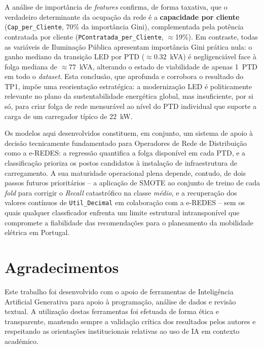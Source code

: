\documentclass[conference]{IEEEtran}
\begin{document}
A an\'alise de import\^ancia de \textit{features} confirma, de forma
taxativa, que o verdadeiro determinante da ocupa\c{c}\~ao da rede \'e a
\textbf{capacidade por cliente} (\texttt{Cap\_per\_Cliente}, 70\% da
import\^ancia Gini), complementada pela pot\^encia contratada por cliente
(\texttt{PContratada\_per\_Cliente}, $\approx$19\%). Em contraste, todas
as vari\'aveis de Ilumina\c{c}\~ao P\'ublica apresentam import\^ancia
Gini pr\'atica nula: o ganho mediano da transi\c{c}\~ao LED por PTD
($\approx 0.32$~kVA) \'e negligenci\'avel face \`a folga mediana de
$\approx 77$~kVA, alterando o estado de viabilidade de apenas 1~PTD em
todo o \textit{dataset}. Esta conclus\~ao, que aprofunda e corrobora o
resultado do TP1, imp\~oe uma reorienta\c{c}\~ao estrat\'egica: a
moderniza\c{c}\~ao LED \'e politicamente relevante no plano da
sustentabilidade energ\'etica global, mas insuficiente, por si s\'o,
para criar folga de rede mensur\'avel ao n\'ivel do PTD individual que
suporte a carga de um carregador t\'ipico de 22~kW.

Os modelos aqui desenvolvidos constituem, em conjunto, um sistema de
apoio \`a decis\~ao tecnicamente fundamentado para Operadores de Rede de
Distribui\c{c}\~ao como a e-REDES: a regress\~ao quantifica a folga
dispon\'ivel em cada PTD, e a classifica\c{c}\~ao prioriza os postos
candidatos \`a instala\c{c}\~ao de infraestrutura de carregamento. A sua
maturidade operacional plena depende, contudo, de dois passos futuros
priorit\'arios -- a aplica\c{c}\~ao de SMOTE ao conjunto de treino de
cada \textit{fold} para corrigir o \textit{Recall} catastr\'ofico na
classe \textit{m\'edio}, e a recupera\c{c}\~ao dos valores cont\'inuos
de \texttt{Util\_Decimal} em colabora\c{c}\~ao com a e-REDES -- sem os
quais qualquer classficador enfrenta um limite estrutural intranspon\'ivel
que compromete a fiabilidade das recomenda\c{c}\~oes para o planeamento
da mobilidade el\'etrica em Portugal.

\section*{Agradecimentos}
 
Este trabalho foi desenvolvido com o apoio de ferramentas de
Intelig\^encia Artificial Generativa para apoio \`a programa\c{c}\~ao,
an\'alise de dados e revis\~ao textual. A utiliza\c{c}\~ao destas
ferramentas foi efetuada de forma \'etica e transparente, mantendo
sempre a valida\c{c}\~ao cr\'itica dos resultados pelos autores e
respeitando as orienta\c{c}\~oes institucionais relativas ao uso de IA
em contexto acad\'emico.
 
\end{document}

